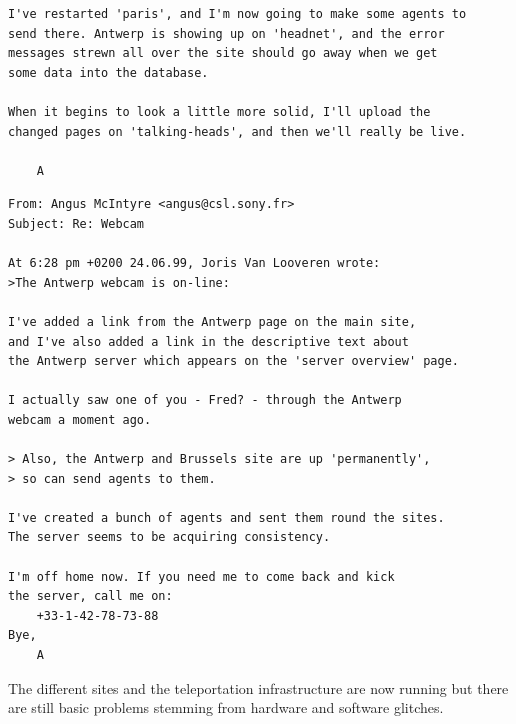 {\begin{verbatim}
I've restarted 'paris', and I'm now going to make some agents to 
send there. Antwerp is showing up on 'headnet', and the error 
messages strewn all over the site should go away when we get 
some data into the database.

When it begins to look a little more solid, I'll upload the 
changed pages on 'talking-heads', and then we'll really be live.

	A
\end{verbatim}
\begin{verbatim}
From: Angus McIntyre <angus@csl.sony.fr>
Subject: Re: Webcam

At 6:28 pm +0200 24.06.99, Joris Van Looveren wrote:
>The Antwerp webcam is on-line:

I've added a link from the Antwerp page on the main site, 
and I've also added a link in the descriptive text about 
the Antwerp server which appears on the 'server overview' page. 

I actually saw one of you - Fred? - through the Antwerp 
webcam a moment ago.

> Also, the Antwerp and Brussels site are up 'permanently', 
> so can send agents to them.

I've created a bunch of agents and sent them round the sites. 
The server seems to be acquiring consistency.

I'm off home now. If you need me to come back and kick 
the server, call me on:
	+33-1-42-78-73-88
Bye,
	A
\end{verbatim}
}


The different sites and the teleportation infrastructure are now running but there are still basic problems 
stemming from hardware and software glitches. 

